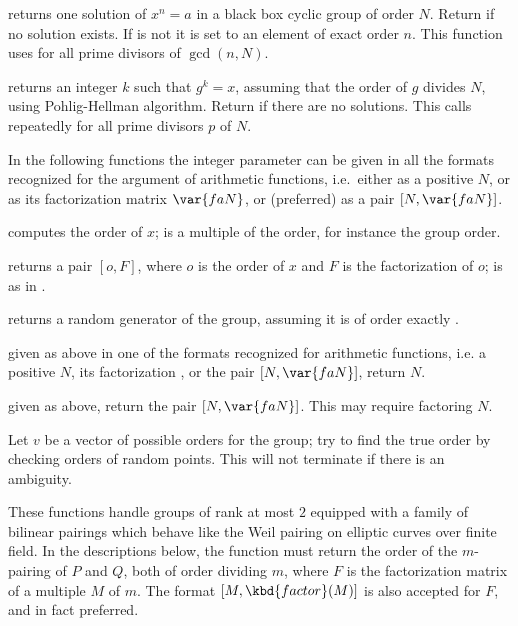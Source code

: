   returns one solution of $x^n = a$ in a
black box cyclic group of order $N$. Return  if no solution exists.
If  is not  it is set to an element of exact order $n$.
This function uses  for all prime divisors of $\gcd(n,N)$.

returns an integer $k$ such that $g^k = x$, assuming that the order of $g$
divides $N$, using Pohlig-Hellman algorithm. Return  if
there are no solutions. This calls  repeatedly for all prime
divisors $p$ of $N$.

In the following functions the integer parameter  can be given
in all the formats recognized for the argument of arithmetic functions,
i.e.~either as a positive  $N$, or as its factorization matrix
$\var{faN}$, or (preferred) as a pair $[N,\var{faN}]$.

computes the order of $x$;  is a multiple of the order, for instance
the group order.

 returns a pair $[o,F]$, where $o$ is the order of $x$ and $F$ is the
factorization of $o$;  is as in .

returns a random generator of the group, assuming it is of order exactly
.

 given  as above in one of the
formats recognized for arithmetic functions, i.e. a positive
 $N$, its factorization , or the pair $[N, \var{faN}]$,
return $N$.

 given  as above,
return the pair $[N, \var{faN}]$. This may require factoring $N$.

Let $v$ be a vector of possible orders for the group; try to find the true
order by checking orders of random points. This will not terminate if there
is an ambiguity.


These functions handle groups of rank at most $2$ equipped with a family of
bilinear pairings which behave like the Weil pairing on elliptic curves over
finite field. In the descriptions below, the function  must return the order of the $m$-pairing of $P$ and $Q$, both of order
dividing $m$, where $F$ is the factorization matrix of a multiple $M$ of $m$.
The format $[M, \kbd{factor}(M)]$ is also accepted for $F$, and in fact
preferred.


